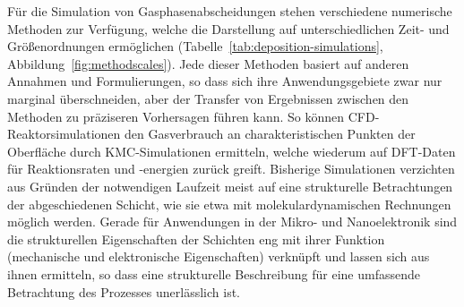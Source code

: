 
Für die Simulation von Gasphasenabscheidungen stehen verschiedene numerische Methoden zur Verfügung, welche die Darstellung auf unterschiedlichen Zeit- und Größenordnungen ermöglichen (Tabelle~\ref{tab:deposition-simulations}, Abbildung~\ref{fig:methodscales}).
Jede dieser Methoden basiert auf anderen Annahmen und Formulierungen, so dass sich ihre Anwendungsgebiete zwar nur marginal überschneiden, aber der Transfer von Ergebnissen zwischen den Methoden zu präziseren Vorhersagen führen kann.
So können CFD-Reaktorsimulationen den Gasverbrauch an charakteristischen Punkten der Oberfläche durch KMC-Simulationen ermitteln, welche wiederum auf DFT-Daten für Reaktionsraten und -energien zurück greift.
Bisherige Simulationen verzichten aus Gründen der notwendigen Laufzeit meist auf eine strukturelle Betrachtungen der abgeschiedenen Schicht, wie sie etwa mit molekulardynamischen Rechnungen möglich werden.
Gerade für Anwendungen in der Mikro- und Nanoelektronik sind die strukturellen Eigenschaften der Schichten eng mit ihrer Funktion (mechanische und elektronische Eigenschaften) verknüpft und lassen sich aus ihnen ermitteln, so dass eine strukturelle Beschreibung für eine umfassende Betrachtung des Prozesses unerlässlich ist.
